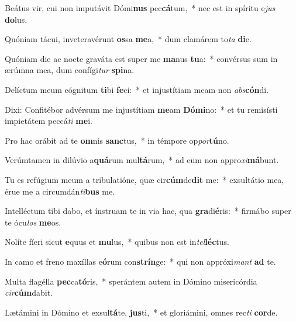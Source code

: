 \item Beátus vir, cui non imputávit Dómi\textbf{nus} pec\textbf{cá}tum,~* nec est in spíritu e\textit{jus} \textbf{do}lus.
\item Quóniam tácui, inveteravérunt \textbf{os}sa \textbf{me}a,~* dum clamárem to\textit{ta} \textbf{di}e.
\item Quóniam die ac nocte graváta est super me \textbf{ma}nus \textbf{tu}a:~* convérsus sum in ærúmna mea, dum confígi\textit{tur} \textbf{spi}na.
\item Delíctum meum cógnitum \textbf{ti}bi \textbf{fe}ci:~* et injustítiam meam non \textit{abs}\textbf{cón}di.
\item Dixi: Confitébor advérsum me injustítiam \textbf{me}am \textbf{Dó}\textbf{mi}no:~* et tu remisísti impietátem peccá\textit{ti} \textbf{me}i.
\item Pro hac orábit ad te \textbf{om}nis \textbf{sanc}tus,~* in témpore op\textit{por}\textbf{tú}no.
\item Verúmtamen in dilúvio a\textbf{quá}rum mul\textbf{tá}rum,~* ad eum non appro\textit{xi}\textbf{má}bunt.
\item Tu es refúgium meum a tribulatióne, quæ cir\textbf{cúm}de\textbf{dit} me:~* exsultátio mea, érue me a circumdán\textit{ti}\textbf{bus} me.
\item Intelléctum tibi dabo, et ínstruam te in via hac, qua \textbf{gra}di\textbf{é}ris:~* firmábo super te ócu\textit{los} \textbf{me}os.
\item Nolíte fíeri sicut \textbf{e}quus et \textbf{mu}lus,~* quibus non est in\textit{tel}\textbf{léc}tus.
\item In camo et freno maxíllas e\textbf{ó}rum con\textbf{strín}ge:~* qui non appróxi\textit{mant} \textbf{ad} te.
\item Multa flagélla \textbf{pec}ca\textbf{tó}ris,~* sperántem autem in Dómino misericórdia \textit{cir}\textbf{cúm}dabit.
\item Lætámini in Dómino et exsul\textbf{tá}te, \textbf{jus}ti,~* et gloriámini, omnes rec\textit{ti} \textbf{cor}de.
